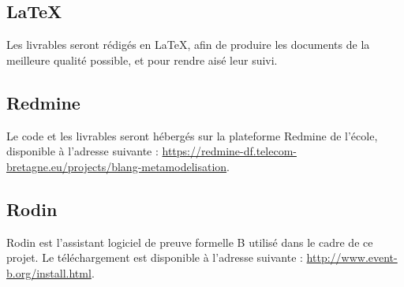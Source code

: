 \documentclass{article}
\begin{document}
\subsection{\LaTeX}

Les livrables seront rédigés en \LaTeX, afin de produire les documents de la meilleure qualité possible, et pour rendre aisé leur suivi.

\subsection{Redmine}

Le code et les livrables seront hébergés sur la plateforme Redmine de l'école, disponible à l'adresse suivante : \href{%
https://redmine-df.telecom-bretagne.eu/projects/blang-metamodelisation}{https://redmine-df.telecom-bretagne.eu/projects/blang-metamodelisation}.

\subsection{Rodin}

Rodin est l'assistant logiciel de preuve formelle B utilisé dans le cadre de ce projet.
Le téléchargement est disponible à l'adresse suivante : \href{http://www.event-b.org/install.html}{http://www.event-b.org/install.html}.


\newpage

\nocite{*}

\printbibheading[title=Références, heading=bibintoc]

\printbibliography[keyword=bmethod, heading=subbibintoc, title={Méthode B}]

\printbibliography[keyword=rodin, heading=subbibintoc, title={Rodin}]

\printbibliography[keyword=openflexo, heading=subbibintoc, title={OpenFlexo}]
\end{document}
